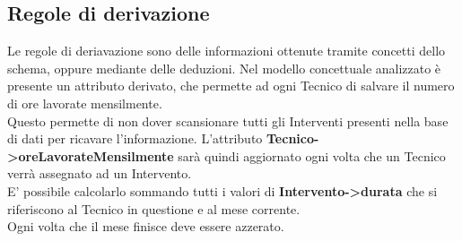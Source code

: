 \documentclass[legalpaper]{article}
\begin{document}
\subsection{Regole di derivazione}
Le regole di deriavazione sono delle informazioni ottenute tramite concetti dello schema, oppure mediante delle deduzioni. Nel modello concettuale analizzato è presente un attributo derivato, 
che permette ad ogni Tecnico di salvare il numero di ore lavorate mensilmente.\\
Questo permette di non dover scansionare tutti gli Interventi presenti nella base di dati per ricavare l'informazione.
L'attributo \textbf{Tecnico->oreLavorateMensilmente} sarà quindi aggiornato ogni volta che un Tecnico verrà assegnato ad un Intervento.\\
E' possibile calcolarlo sommando tutti i valori di \textbf{Intervento->durata} che si riferiscono al Tecnico in questione e al mese corrente.\\
Ogni volta che il mese finisce deve essere azzerato.\\
\end{document}
